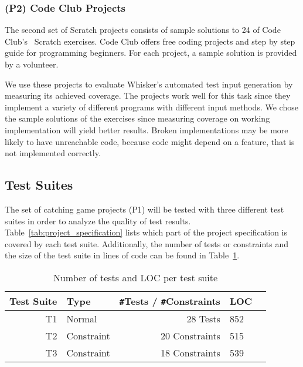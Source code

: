 \subsubsection{(P2) Code Club Projects}

The second set of Scratch projects consists of sample solutions to 24 of Code Club's~\cite{codeclub} Scratch exercises.
Code Club offers free coding projects and step by step guide for programming beginners.
For each project, a sample solution is provided by a volunteer.
\parspace

We use these projects to evaluate Whisker's automated test input generation by measuring its achieved coverage.
The projects work well for this task since they implement a variety of different programs with different input methods.
We chose the sample solutions of the exercises since measuring coverage on working implementation will yield better results.
Broken implementations may be more likely to have unreachable code,
because code might depend on a feature, that is not implemented correctly.

\subsection{Test Suites}

The set of catching game projects (P1) will be tested with three different test suites in order to analyze the quality of test results.
Table~\ref{tab:project_specification} lists which part of the project specification is covered by each test suite.
Additionally, the number of tests or constraints and the size of the test suite in lines of code can be found in Table~\ref{tab:test_suite_statistics}.

\begin{table}[htpb]
    \centering
    \scriptsize
    \begin{tabular}{rlrlr}
        \toprule
        Test Suite & Type       & \texttt{\#}Tests / \texttt{\#}Constraints & LOC \\
        \midrule
        T1         & Normal     & 28 Tests                                  & 852 \\
        T2         & Constraint & 20 Constraints                            & 515 \\
        T3         & Constraint & 18 Constraints                            & 539 \\
        \bottomrule
    \end{tabular}

    \caption{Number of tests and LOC per test suite}
    \label{tab:test_suite_statistics}
\end{table}

